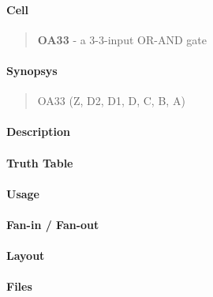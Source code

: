 \label{OA33}
\paragraph{Cell}
\begin{quote}
    \textbf{OA33} - a 3-3-input OR-AND gate
\end{quote}

\paragraph{Synopsys}
\begin{quote}
    OA33 (Z, D2, D1, D, C, B, A)
\end{quote}

\paragraph{Description}

%

\paragraph{Truth Table}
%

\paragraph{Usage}

\paragraph{Fan-in / Fan-out}

\paragraph{Layout}

\paragraph{Files}
